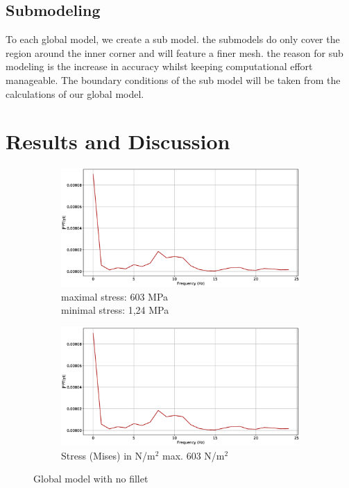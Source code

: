 \documentclass[12pt]{article}
\begin{document}
\subsection{Submodeling}

To each global model, we create a sub model. the submodels do only cover the 
region around the inner corner and will feature a finer mesh. the reason 
for sub modeling is the increase in accuracy whilst keeping computational 
effort manageable. The boundary conditions of the sub model will be taken 
from the calculations of our global model.

\pagebreak
\section{Results and Discussion}
\begin{figure}[!htb]
  \centering
  \begin{subfigure}{.5\textwidth}
    \centering
    \includegraphics[width=0.95\linewidth]{pics/vib_fourier}
    \caption{maximal stress: 603 MPa \\\hspace{\textwidth}minimal stress: 1,24 MPa}
  \end{subfigure}%
  \begin{subfigure}{.5\textwidth}
    \centering
    \includegraphics[width=0.95\linewidth]{pics/vib_fourier}
    \caption{Stress (Mises) in N/m$^{2}$ max. 603 N/m$^{2}$}
   \end{subfigure}
  \caption{Global model with no fillet}
\end{figure}
\end{document}
